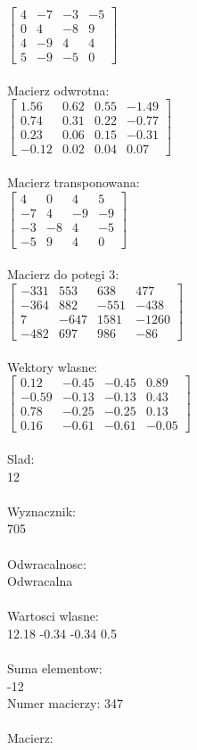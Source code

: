 \documentclass[a4paper,12pt]{article}
\begin{document}
$\begin{bmatrix} 4&-7&-3&-5\\0&4&-8&9\\4&-9&4&4\\5&-9&-5&0 \end{bmatrix}$
\\
\\
Macierz odwrotna:\\

$\begin{bmatrix} 1.56&0.62&0.55&-1.49\\0.74&0.31&0.22&-0.77\\0.23&0.06&0.15&-0.31\\-0.12&0.02&0.04&0.07 \end{bmatrix}$
\\
\\
Macierz transponowana:\\

$\begin{bmatrix} 4&0&4&5\\-7&4&-9&-9\\-3&-8&4&-5\\-5&9&4&0 \end{bmatrix}$
\\
\\
Macierz do potegi 3:\\

$\begin{bmatrix} -331&553&638&477\\-364&882&-551&-438\\7&-647&1581&-1260\\-482&697&986&-86 \end{bmatrix}$
\\
\\
Wektory wlasne:\\

$\begin{bmatrix} 0.12&-0.45&-0.45&0.89\\-0.59&-0.13&-0.13&0.43\\0.78&-0.25&-0.25&0.13\\0.16&-0.61&-0.61&-0.05 \end{bmatrix}$
\\
\\
Slad:\\
12
\\
\\
Wyznacznik:\\
705
\\
\\
Odwracalnosc:\\
Odwracalna
\\
\\
Wartosci wlasne:\\
12.18 -0.34 -0.34 0.5
\\
\\
Suma elementow:\\
-12
\\
\newpage
Numer macierzy:
347
\\
\\
Macierz:\\
\end{document}
